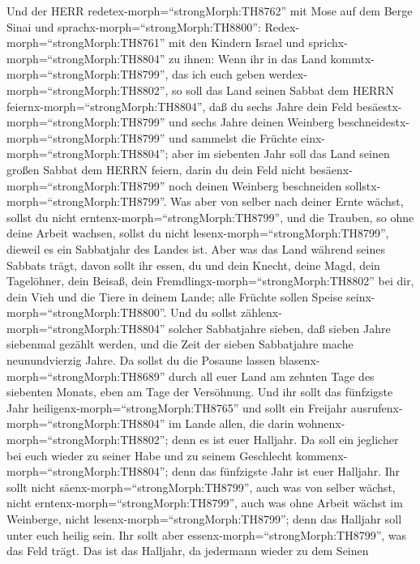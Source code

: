  Und der HERR redetex-morph=``strongMorph:TH8762'' mit Mose
auf dem Berge Sinai und sprachx-morph=``strongMorph:TH8800'':
 Redex-morph=``strongMorph:TH8761'' mit den Kindern Israel
und sprichx-morph=``strongMorph:TH8804'' zu ihnen: Wenn ihr in das Land
kommtx-morph=``strongMorph:TH8799'', das ich euch geben
werdex-morph=``strongMorph:TH8802'', so soll das Land seinen Sabbat dem
HERRN feiernx-morph=``strongMorph:TH8804'',  daß du sechs
Jahre dein Feld besäestx-morph=``strongMorph:TH8799'' und sechs Jahre
deinen Weinberg beschneidestx-morph=``strongMorph:TH8799'' und sammelst
die Früchte einx-morph=``strongMorph:TH8804'';  aber im
siebenten Jahr soll das Land seinen großen Sabbat dem HERRN feiern,
darin du dein Feld nicht besäenx-morph=``strongMorph:TH8799'' noch
deinen Weinberg beschneiden sollstx-morph=``strongMorph:TH8799''.
 Was aber von selber nach deiner Ernte wächst, sollst du
nicht erntenx-morph=``strongMorph:TH8799'', und die Trauben, so ohne
deine Arbeit wachsen, sollst du nicht
lesenx-morph=``strongMorph:TH8799'', dieweil es ein Sabbatjahr des
Landes ist.  Aber was das Land während seines Sabbats trägt,
davon sollt ihr essen, du und dein Knecht, deine Magd, dein Tagelöhner,
dein Beisaß, dein Fremdlingx-morph=``strongMorph:TH8802'' bei dir,
 dein Vieh und die Tiere in deinem Lande; alle Früchte
sollen Speise seinx-morph=``strongMorph:TH8800''.  Und du
sollst zählenx-morph=``strongMorph:TH8804'' solcher Sabbatjahre sieben,
daß sieben Jahre siebenmal gezählt werden, und die Zeit der sieben
Sabbatjahre mache neunundvierzig Jahre.  Da sollst du die
Posaune lassen blasenx-morph=``strongMorph:TH8689'' durch all euer Land
am zehnten Tage des siebenten Monats, eben am Tage der Versöhnung.
 Und ihr sollt das fünfzigste Jahr
heiligenx-morph=``strongMorph:TH8765'' und sollt ein Freijahr
ausrufenx-morph=``strongMorph:TH8804'' im Lande allen, die darin
wohnenx-morph=``strongMorph:TH8802''; denn es ist euer Halljahr. Da soll
ein jeglicher bei euch wieder zu seiner Habe und zu seinem Geschlecht
kommenx-morph=``strongMorph:TH8804'';  denn das fünfzigste
Jahr ist euer Halljahr. Ihr sollt nicht
säenx-morph=``strongMorph:TH8799'', auch was von selber wächst, nicht
erntenx-morph=``strongMorph:TH8799'', auch was ohne Arbeit wächst im
Weinberge, nicht lesenx-morph=``strongMorph:TH8799'';  denn
das Halljahr soll unter euch heilig sein. Ihr sollt aber
essenx-morph=``strongMorph:TH8799'', was das Feld trägt. 
Das ist das Halljahr, da jedermann wieder zu dem Seinen
